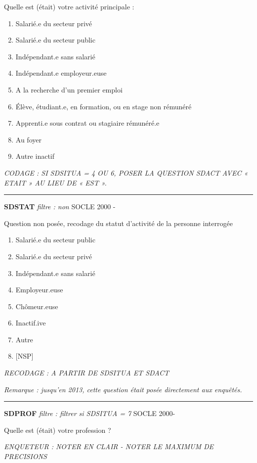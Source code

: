 \documentclass[12pt,a4paper]{reedthesis}
\providecommand{\tightlist}{%
  \setlength{\itemsep}{0pt}\setlength{\parskip}{0pt}}
\begin{document}
Quelle est (était) votre activité principale :
\begin{enumerate}
\def\labelenumi{\arabic{enumi}.}
\tightlist
\item
  Salarié.e du secteur privé
\item
  Salarié.e du secteur public
\item
  Indépendant.e sans salarié
\item
  Indépendant.e employeur.euse
\item
  A la recherche d'un premier emploi
\item
  Élève, étudiant.e, en formation, ou en stage non rémunéré
\item
  Apprenti.e sous contrat ou stagiaire rémunéré.e
\item
  Au foyer
\item
  Autre inactif
\end{enumerate}
\emph{CODAGE : SI SDSITUA = 4 OU 6, POSER LA QUESTION SDACT AVEC « ETAIT » AU LIEU DE « EST ».}
\begin{center}\rule{0.5\linewidth}{0.5pt}\end{center}

\textbf{SDSTAT} \emph{filtre : non} SOCLE 2000 -

Question non posée, recodage du statut d'activité de la personne interrogée
\begin{enumerate}
\def\labelenumi{\arabic{enumi}.}
\tightlist
\item
  Salarié.e du secteur public
\item
  Salarié.e du secteur privé
\item
  Indépendant.e sans salarié
\item
  Employeur.euse
\item
  Chômeur.euse
\item
  Inactif.ive
\item
  Autre
\item
  {[}NSP{]}
\end{enumerate}
\emph{RECODAGE : A PARTIR DE SDSITUA ET SDACT}

\emph{Remarque : jusqu'en 2013, cette question était posée directement aux enquêtés.}
\begin{center}\rule{0.5\linewidth}{0.5pt}\end{center}

\textbf{SDPROF} \emph{filtre : filtrer si SDSITUA = 7} SOCLE 2000-

Quelle est (était) votre profession ?

\emph{ENQUETEUR : NOTER EN CLAIR - NOTER LE MAXIMUM DE PRECISIONS}
\end{document}
